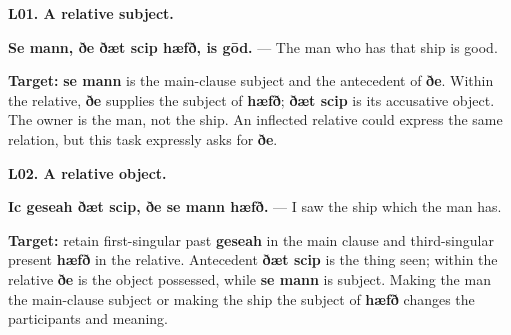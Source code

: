 \par\begin{minipage}{\linewidth}\raggedright
\textbf{L01. A relative subject.}

\textbf{Se mann, ðe ðæt scip hæfð, is gōd.} — The man who has that ship is good.

\textbf{Target:} \textbf{se mann} is the main-clause subject and the antecedent of \textbf{ðe}. Within the relative, \textbf{ðe} supplies the subject of \textbf{hæfð}; \textbf{ðæt scip} is its accusative object. The owner is the man, not the ship. An inflected relative could express the same relation, but this task expressly asks for \textbf{ðe}.

\end{minipage}\par\addvspace{4pt}

\par\begin{minipage}{\linewidth}\raggedright
\textbf{L02. A relative object.}

\textbf{Ic geseah ðæt scip, ðe se mann hæfð.} — I saw the ship which the man has.

\textbf{Target:} retain first-singular past \textbf{geseah} in the main clause and third-singular present \textbf{hæfð} in the relative. Antecedent \textbf{ðæt scip} is the thing seen; within the relative \textbf{ðe} is the object possessed, while \textbf{se mann} is subject. Making the man the main-clause subject or making the ship the subject of \textbf{hæfð} changes the participants and meaning.

\end{minipage}\par\addvspace{4pt}


